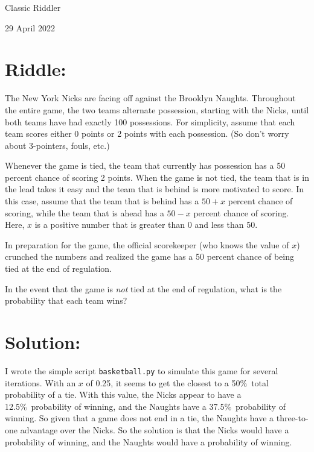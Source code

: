 \documentclass{article}
\begin{document}
\pagestyle{empty} %

\begin{center}
{\LARGE Classic Riddler}

\vspace{0.15in}

{\Large 29 April 2022}
\end{center}


\section*{Riddle:}

The New York Nicks are facing off against the Brooklyn Naughts.
Throughout the entire game, the two teams alternate possession, starting with the Nicks, until both teams have had exactly 100 possessions.
For simplicity, assume that each team scores either 0 points or 2 points with each possession.
(So don't worry about 3-pointers, fouls, etc.)

Whenever the game is tied, the team that currently has possession has a 50 percent chance of scoring 2 points.
When the game is not tied, the team that is in the lead takes it easy and the team that is behind is more motivated to score.
In this case, assume that the team that is behind has a $50+x$ percent chance of scoring, while the team that is ahead has a $50-x$ percent chance of scoring.
Here, $x$ is a positive number that is greater than 0 and less than 50.

In preparation for the game, the official scorekeeper (who knows the value of $x$) crunched the numbers and realized the game has a 50 percent chance of being tied at the end of regulation.

In the event that the game is \textit{not} tied at the end of regulation, what is the probability that each team wins?


\section*{Solution:}

I wrote the simple script \texttt{basketball.py} to simulate this game for several iterations.
With an $x$ of 0.25, it seems to get the closest to a 50\%\ total probability of a tie.
With this value, the Nicks appear to have a 12.5\%\ probability of winning, and the Naughts have a 37.5\%\ probability of winning.
So given that a game does not end in a tie, the Naughts have a three-to-one advantage over the Nicks.
So the solution is that the Nicks would have a  probability of winning, and the Naughts would have a  probability of winning.
\end{document}
